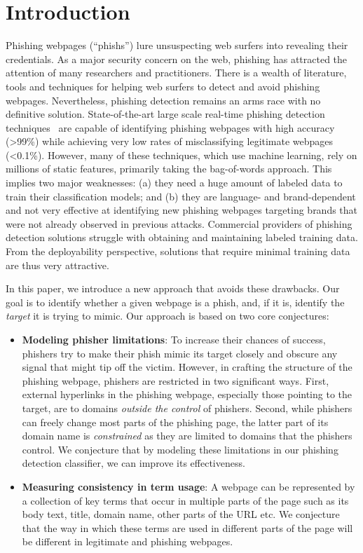 \documentclass[10pt,conference,compsocconf,letterpaper]{IEEEtran}
\begin{document}
\section{Introduction}

Phishing webpages (``phishs'') lure unsuspecting web surfers into revealing their credentials. As a major security concern on the web, phishing has attracted the attention of many researchers and practitioners. There is a wealth of literature, tools and techniques for helping web surfers to detect and avoid phishing webpages. Nevertheless, phishing detection remains an arms race with no definitive solution. State-of-the-art large scale real-time phishing detection techniques~\cite{whittaker:2010:large} are capable of identifying phishing webpages with high accuracy (\textgreater 99\%) while achieving very low rates of misclassifying legitimate webpages (\textless 0.1\%).
However, many of these techniques, which use machine learning, rely on millions of static features, primarily taking the bag-of-words approach. This implies two major weaknesses: (a)  they need a huge amount of labeled data to train their classification models; and (b) they are language- and brand-dependent and not very effective at identifying new phishing webpages targeting brands that were not already observed in previous attacks. Commercial providers of phishing detection solutions struggle with obtaining and maintaining labeled training data. From the deployability perspective, solutions that require minimal training data are thus very attractive.

In this paper, we introduce a new approach that avoids these drawbacks. Our goal is to identify whether a given webpage is a phish, and, if it is, identify the \emph{target} it is trying to mimic.
Our approach is based on two core conjectures:
\begin{itemize}
\item\textbf{Modeling phisher limitations}: To increase their chances of success, phishers try to make their phish mimic its target closely and obscure any signal that might tip off the victim. However, in crafting the structure of the phishing webpage, phishers are restricted in two significant ways. First, external hyperlinks in the phishing webpage, especially those pointing to the target, are to domains \emph{outside the control} of phishers. Second, while phishers can freely change most parts of the phishing page, the latter part of its domain name is \emph{constrained} as they are limited to domains that the phishers control. We conjecture that by modeling these limitations in our phishing detection classifier, we can improve its effectiveness. 
\item\textbf{Measuring consistency in term usage}: A webpage can be represented by a collection of key terms that occur in multiple parts of the page such as its body text, title, domain name, other parts of the URL etc. We conjecture that the way in which these terms are used in different parts of the page will be different in legitimate and phishing webpages.
\end{itemize}
\end{document}
